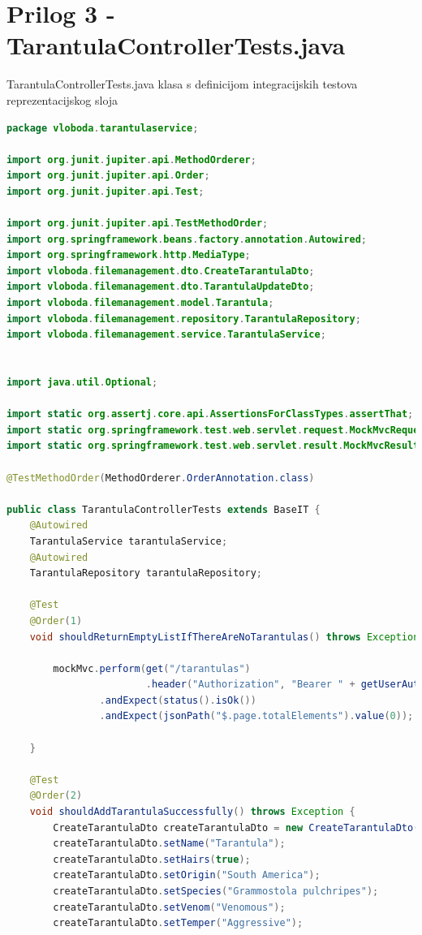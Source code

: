 \documentclass[a4paper,12pt,oneside]{article}
\begin{document}
\newpage
\section*{Prilog 3 - TarantulaControllerTests.java}
\label{prilog 1}
TarantulaControllerTests.java klasa s definicijom integracijskih testova reprezentacijskog sloja

\begin{lstlisting}[language=Java]
package vloboda.tarantulaservice;

import org.junit.jupiter.api.MethodOrderer;
import org.junit.jupiter.api.Order;
import org.junit.jupiter.api.Test;

import org.junit.jupiter.api.TestMethodOrder;
import org.springframework.beans.factory.annotation.Autowired;
import org.springframework.http.MediaType;
import vloboda.filemanagement.dto.CreateTarantulaDto;
import vloboda.filemanagement.dto.TarantulaUpdateDto;
import vloboda.filemanagement.model.Tarantula;
import vloboda.filemanagement.repository.TarantulaRepository;
import vloboda.filemanagement.service.TarantulaService;


import java.util.Optional;

import static org.assertj.core.api.AssertionsForClassTypes.assertThat;
import static org.springframework.test.web.servlet.request.MockMvcRequestBuilders.*;
import static org.springframework.test.web.servlet.result.MockMvcResultMatchers.*;

@TestMethodOrder(MethodOrderer.OrderAnnotation.class)

public class TarantulaControllerTests extends BaseIT {
    @Autowired
    TarantulaService tarantulaService;
    @Autowired
    TarantulaRepository tarantulaRepository;

    @Test
    @Order(1)
    void shouldReturnEmptyListIfThereAreNoTarantulas() throws Exception {

        mockMvc.perform(get("/tarantulas")
                        .header("Authorization", "Bearer " + getUserAuthToken()))
                .andExpect(status().isOk())
                .andExpect(jsonPath("$.page.totalElements").value(0));

    }

    @Test
    @Order(2)
    void shouldAddTarantulaSuccessfully() throws Exception {
        CreateTarantulaDto createTarantulaDto = new CreateTarantulaDto();
        createTarantulaDto.setName("Tarantula");
        createTarantulaDto.setHairs(true);
        createTarantulaDto.setOrigin("South America");
        createTarantulaDto.setSpecies("Grammostola pulchripes");
        createTarantulaDto.setVenom("Venomous");
        createTarantulaDto.setTemper("Aggressive");


\end{lstlisting}
\end{document}
